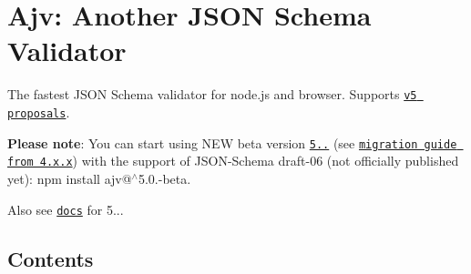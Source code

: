 

\section*{Ajv\+: Another J\+S\+ON Schema Validator}

The fastest J\+S\+ON Schema validator for node.\+js and browser. Supports \href{https://github.com/json-schema/json-schema/wiki/v5-Proposals}{\tt v5 proposals}.

\href{https://travis-ci.org/epoberezkin/ajv}{\tt } \href{https://www.npmjs.com/package/ajv}{\tt } \href{https://www.npmjs.com/package/ajv}{\tt } \href{https://codeclimate.com/github/epoberezkin/ajv}{\tt } \href{https://coveralls.io/github/epoberezkin/ajv?branch=master}{\tt } \href{https://gitter.im/ajv-validator/ajv}{\tt }

{\bfseries Please note}\+: You can start using N\+EW beta version \href{https://github.com/epoberezkin/ajv/releases/tag/5.0.4-beta.3}{\tt 5..} (see \href{https://github.com/epoberezkin/ajv/releases/tag/5.0.1-beta.0}{\tt migration guide from 4.\+x.\+x}) with the support of J\+S\+O\+N-\/\+Schema draft-\/06 (not officially published yet)\+: {\ttfamily npm install ajv@$^\wedge$5.0.-\/beta}.

Also see \href{https://github.com/epoberezkin/ajv/tree/5.0.4-beta.3}{\tt docs} for 5...

\subsection*{Contents}


